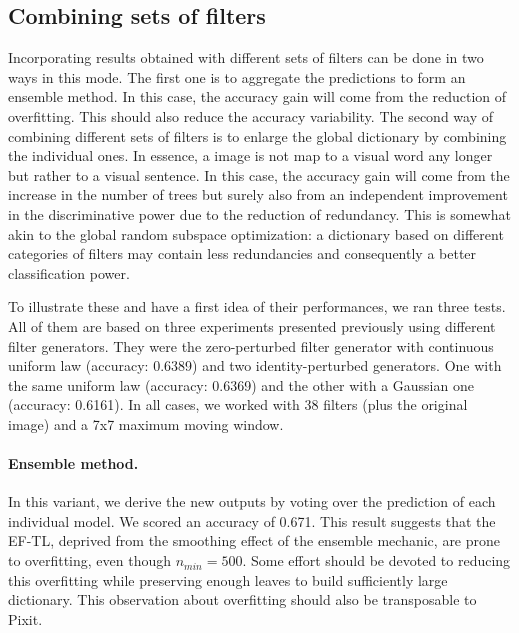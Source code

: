 \documentclass[a4paper]{report}
\newlength{\larg}
\begin{document}
	\subsection{Combining sets of filters}
	Incorporating results obtained with different sets of filters can be done in two ways in this mode. The first one is to aggregate the predictions to form an ensemble method. In this case, the accuracy gain will come from the reduction of overfitting. This should also reduce the accuracy variability. The second way of combining different sets of filters is to enlarge the global dictionary by combining the individual ones. In essence, a image is not map to a visual word any longer but rather to a visual sentence. In this case, the accuracy gain will come from the increase in the number of trees but surely also from an independent improvement in the discriminative power due to the reduction of redundancy. This is somewhat akin to the global random subspace optimization: a dictionary based on different categories of filters may contain less redundancies and consequently a better classification power.
	\par
	To illustrate these and have a first idea of their performances, we ran three tests. All of them are based on three experiments presented previously using different filter generators. They were the zero-perturbed filter generator with continuous uniform law (accuracy: 0.6389) and two identity-perturbed generators. One with the same uniform law (accuracy: 0.6369) and the other with a Gaussian one (accuracy: 0.6161). In all cases, we worked with 38 filters (plus the original image) and a 7x7 maximum moving window.
	
	\paragraph{Ensemble method.}
	In this variant, we derive the new outputs by voting over the prediction of each individual model. We scored an accuracy of 0.671. This result suggests that the EF-TL, deprived from the smoothing effect of the ensemble mechanic, are prone to overfitting, even though $n_{min} = 500$. Some effort should be devoted to reducing this overfitting while preserving enough leaves to build sufficiently large dictionary. This observation about overfitting should also be transposable to Pixit.
	
\end{document}
